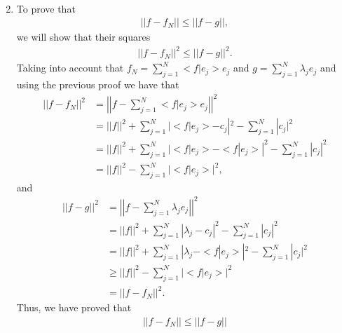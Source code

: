 \begin{enumerate}[label=(\alph*)]
\begin{align*}
\end{align*}
\item To prove that
\begin{align*}
||f-f_N||\leq||f-g||,
\end{align*}
we will show that their squares
\begin{align*}
||f-f_N||^2\leq||f-g||^2.
\end{align*}
Taking into account that $f_N=\sum_{j=1}^N<f|e_j>e_j$ and $g=\sum_{j=1}^N\lambda_je_j$ and using the previous proof we have that
\begin{align*}
||f-f_N||^2&=\left|\left|f-\sum_{j=1}^N<f|e_j>e_j\right|\right|^2\\
&=||f||^2+\sum_{j=1}^N|<f|e_j>-c_j|^2-\sum_{j=1}^N|c_j|^2\\
&=||f||^2+\sum_{j=1}^N|<f|e_j>-<f|e_j>|^2-\sum_{j=1}^N|c_j|^2\\
&=||f||^2-\sum_{j=1}^N|<f|e_j>|^2,
\end{align*}
and
\begin{align*}
||f-g||^2&=\left|\left|f-\sum_{j=1}^N\lambda_je_j\right|\right|^2\\
&=||f||^2+\sum_{j=1}^N|\lambda_j-c_j|^2-\sum_{j=1}^N|c_j|^2\\
&=||f||^2+\sum_{j=1}^N|\lambda_j-<f|e_j>|^2-\sum_{j=1}^N|c_j|^2\\
&\geq||f||^2-\sum_{j=1}^N|<f|e_j>|^2\\
&=||f-f_N||^2.
\end{align*}
Thus, we have proved that
\begin{align*}
||f-f_N||\leq||f-g||
\end{align*}

\end{enumerate}
